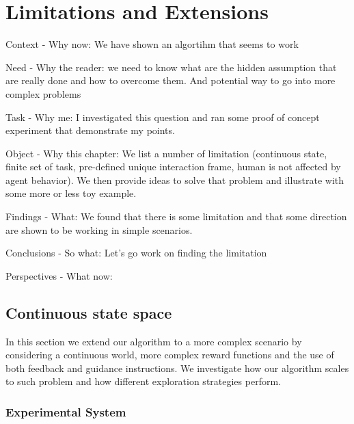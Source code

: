 \renewcommand{\chapterpath}{\allchapterspath/limitations}
\renewcommand{\imgpath}{\chapterpath/img}

\chapter{Limitations and Extensions}
\label{chapter:limitations}
\minitoc

Context - Why now: We have shown an algortihm that seems to work

Need - Why the reader: we need to know what are the hidden assumption that are really done and how to overcome them. And potential way to go into more complex problems

Task - Why me: I investigated this question and ran some proof of concept experiment that demonstrate my points.

Object - Why this chapter: We list a number of limitation (continuous state, finite set of task, pre-defined unique interaction frame, human is not affected by agent behavior). We then provide ideas to solve that problem and illustrate with some more or less toy example.

Findings - What: We found that there is some limitation and that some direction are shown to be working in simple scenarios.

Conclusions - So what: Let's go work on finding the limitation

Perspectives - What now: 

\section{Continuous state space}


In this section we extend our algorithm to a more complex scenario by considering a continuous world, more complex reward functions and the use of both feedback and guidance instructions. We investigate how our algorithm scales to such problem and how different exploration strategies perform.

\subsection{Experimental System}

